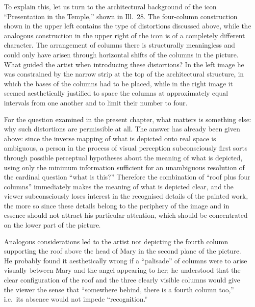 

To explain this, let us turn to the architectural background of the icon
``Presentation in the Temple,'' shown in Ill.~28.  The four-column construction shown
in the upper left contains the type of distortions discussed above, while the analogous
construction in the upper right of the icon is of a completely different character.
The arrangement of columns there is structurally meaningless and could only have arisen
through horizontal shifts of the columns in the picture.  What guided the artist when
introducing these distortions?  In the left image he was constrained by the narrow strip
at the top of the architectural structure, in which the bases of the columns had to be
placed, while in the right image it seemed aesthetically justified to space the columns
at approximately equal intervals from one another and to limit their number to four.


For the question examined in the present chapter, what matters is something else: why
such distortions are permissible at all.  The answer has already been given above: since
the inverse mapping of what is depicted onto real space is ambiguous, a person in the
process of visual perception subconsciously first sorts through possible perceptual
hypotheses about the meaning of what is depicted, using only the minimum information
sufficient for an unambiguous resolution of the cardinal question ``what is this?''
Therefore the combination of ``roof plus four columns'' immediately makes the meaning of
what is depicted clear, and the viewer subconsciously loses interest in the recognised
details of the painted work, the more so since these details belong to the periphery of
the image and in essence should not attract his particular attention, which should be
concentrated on the lower part of the picture.

Analogous considerations led to the artist not depicting the fourth column supporting
the roof above the head of Mary in the second plane of the picture.  He probably found
it aesthetically wrong if a ``palisade'' of columns were to arise visually between Mary
and the angel appearing to her; he understood that the clear configuration of the roof
and the three clearly visible columns would give the viewer the sense that ``somewhere
behind, there is a fourth column too,'' i.e.\ its absence would not impede ``recognition.''

